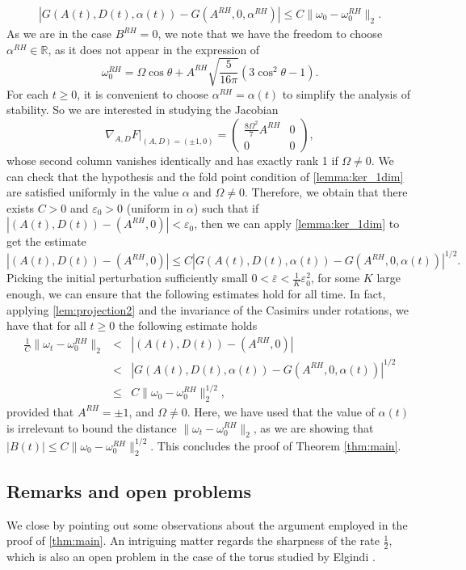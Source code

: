 \documentclass{amsart}
\def\R{{\mathbb{R}}}
\def\eps{{\varepsilon}}
\begin{document}
\begin{eqnarray}
    |G(A(t),D(t),\alpha(t))-G(A^{RH},0,\alpha^{RH})|\leq C \|\omega_0-\omega_0^{RH}\|_2.
\end{eqnarray}
As we are in the case $B^{RH}=0$, we note that we have the freedom to choose $\alpha^{RH}\in \R$, as it does not appear in the expression of 
$$
\omega_0^{RH}=\Omega\cos\theta+A^{RH}\sqrt{\frac{5}{16\pi}}(3\cos^2\theta-1).
$$ 
For each $t\geq0$, it is convenient to choose $\alpha^{RH}=\alpha(t)$ to simplify the analysis of stability. So we are interested in studying the Jacobian 
$$
\nabla_{A,D} F|_{(A,D)=(\pm 1,0)}=\begin{pmatrix}
\frac{8\Omega^2}{7} A^{RH} &0\\
0 & 0
\end{pmatrix},
$$ 
whose second column vanishes identically and has exactly rank 1 if $\Omega\ne 0$. We can check that the hypothesis and the fold point condition of \cref{lemma:ker_1dim} are satisfied uniformly in the value $\alpha$ and $\Omega\ne 0$. Therefore, we obtain that there exists $C>0$ and $\eps_0>0$ (uniform in $\alpha$) such that if $|(A(t),D(t))-(A^{RH},0)|<\eps_0$, then we can apply \cref{lemma:ker_1dim} to get the estimate
$$
    |(A(t),D(t))-(A^{RH},0)|\leq C|G(A(t),D(t),\alpha(t))-G(A^{RH},0,\alpha(t))|^{1/2}.
$$
Picking the initial perturbation sufficiently small $0<\bar\eps<\frac{1}{K}\eps_0^2$, for some $K$ large enough, we can ensure that the following estimates hold for all time. In fact, applying \cref{lem:projection2} and the invariance of the Casimirs under rotations, we have that for all $t\geq0$ the following estimate holds
\begin{eqnarray*}
    \frac{1}{C}\|\omega_t-\omega^{RH}_0\|_2&<&|(A(t),D(t))-(A^{RH},0)|\\
    &<&|G(A(t),D(t),\alpha(t))-G(A^{RH},0,\alpha(t))|^{1/2}\\
    &\leq& C\|\omega_0-\omega^{RH}_0\|_2^{1/2},
    \label{eq:final_Ck_zonal}
\end{eqnarray*}
provided that $A^{RH}=\pm1$, and $\Omega\ne 0$.
Here, we have used that the value of $\alpha(t)$ is irrelevant to bound the distance $\|\omega_t-\omega^{RH}_0\|_2$, as we are showing that $|B(t)|\le C\|\omega_0-\omega^{RH}_0\|_2^{1/2}$. This concludes the proof of Theorem \ref{thm:main}.


\subsection{Remarks and open problems}
We close by pointing out some observations about the argument employed in the proof of \cref{thm:main}. An intriguing matter regards the sharpness of the rate $\frac{1}{2}$, which is also an open problem in the case of the torus studied by Elgindi \cite[Section 1.2]{elgindi2023remarkstabilityenergymaximizers}.
\end{document}
